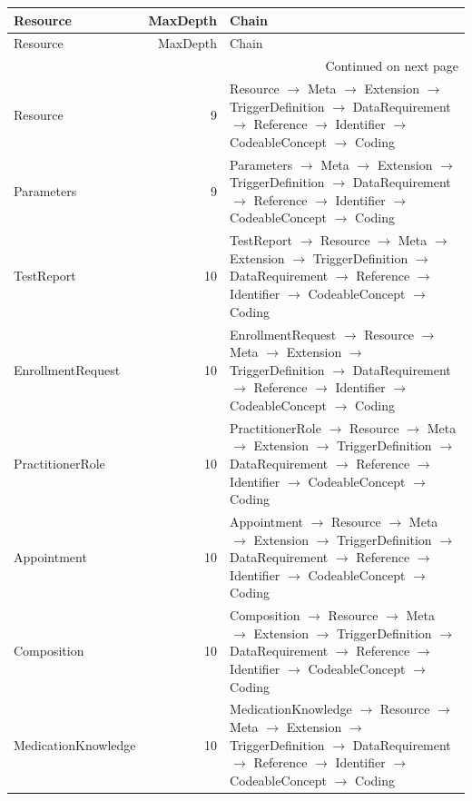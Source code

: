 \begin{longtable}{lrl}
\toprule
Resource & MaxDepth & Chain \\
\midrule
\endfirsthead
\toprule
Resource & MaxDepth & Chain \\
\midrule
\endhead
\midrule
\multicolumn{3}{r}{Continued on next page} \\
\midrule
\endfoot
\bottomrule
\endlastfoot
Resource & 9 & Resource $\rightarrow$ Meta $\rightarrow$ Extension $\rightarrow$ TriggerDefinition $\rightarrow$ DataRequirement $\rightarrow$ Reference $\rightarrow$ Identifier $\rightarrow$ CodeableConcept $\rightarrow$ Coding \\
Parameters & 9 & Parameters $\rightarrow$ Meta $\rightarrow$ Extension $\rightarrow$ TriggerDefinition $\rightarrow$ DataRequirement $\rightarrow$ Reference $\rightarrow$ Identifier $\rightarrow$ CodeableConcept $\rightarrow$ Coding \\
TestReport & 10 & TestReport $\rightarrow$ Resource $\rightarrow$ Meta $\rightarrow$ Extension $\rightarrow$ TriggerDefinition $\rightarrow$ DataRequirement $\rightarrow$ Reference $\rightarrow$ Identifier $\rightarrow$ CodeableConcept $\rightarrow$ Coding \\
EnrollmentRequest & 10 & EnrollmentRequest $\rightarrow$ Resource $\rightarrow$ Meta $\rightarrow$ Extension $\rightarrow$ TriggerDefinition $\rightarrow$ DataRequirement $\rightarrow$ Reference $\rightarrow$ Identifier $\rightarrow$ CodeableConcept $\rightarrow$ Coding \\
PractitionerRole & 10 & PractitionerRole $\rightarrow$ Resource $\rightarrow$ Meta $\rightarrow$ Extension $\rightarrow$ TriggerDefinition $\rightarrow$ DataRequirement $\rightarrow$ Reference $\rightarrow$ Identifier $\rightarrow$ CodeableConcept $\rightarrow$ Coding \\
Appointment & 10 & Appointment $\rightarrow$ Resource $\rightarrow$ Meta $\rightarrow$ Extension $\rightarrow$ TriggerDefinition $\rightarrow$ DataRequirement $\rightarrow$ Reference $\rightarrow$ Identifier $\rightarrow$ CodeableConcept $\rightarrow$ Coding \\
Composition & 10 & Composition $\rightarrow$ Resource $\rightarrow$ Meta $\rightarrow$ Extension $\rightarrow$ TriggerDefinition $\rightarrow$ DataRequirement $\rightarrow$ Reference $\rightarrow$ Identifier $\rightarrow$ CodeableConcept $\rightarrow$ Coding \\
MedicationKnowledge & 10 & MedicationKnowledge $\rightarrow$ Resource $\rightarrow$ Meta $\rightarrow$ Extension $\rightarrow$ TriggerDefinition $\rightarrow$ DataRequirement $\rightarrow$ Reference $\rightarrow$ Identifier $\rightarrow$ CodeableConcept $\rightarrow$ Coding \\

\end{longtable}
